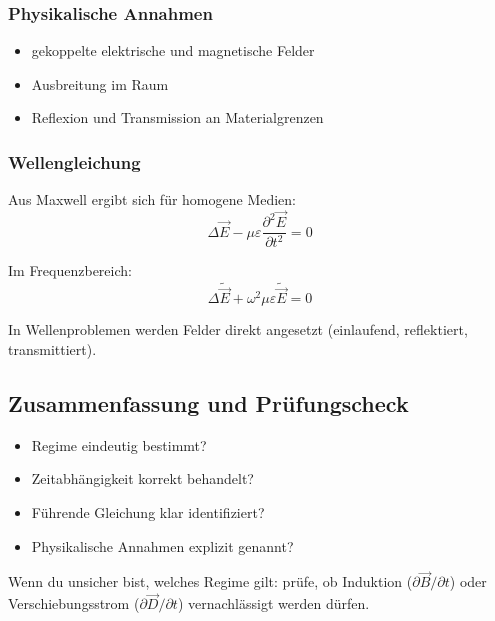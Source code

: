 \documentclass[a4paper]{article}
\newcommand{\E}{\vec E}
\newcommand{\D}{\vec D}
\newcommand{\B}{\vec B}
\newcommand{\eps}{\varepsilon}
\begin{document}
\subsubsection{Physikalische Annahmen}

\begin{itemize}
  \item gekoppelte elektrische und magnetische Felder
  \item Ausbreitung im Raum
  \item Reflexion und Transmission an Materialgrenzen
\end{itemize}

\subsubsection{Wellengleichung}

Aus Maxwell ergibt sich für homogene Medien:
\[
\Delta \E - \mu\eps \frac{\partial^2 \E}{\partial t^2} = 0
\]

Im Frequenzbereich:
\[
\Delta \tilde{\E} + \omega^2 \mu \eps \tilde{\E} = 0
\]

\begin{merke}
In Wellenproblemen werden Felder direkt angesetzt
(einlaufend, reflektiert, transmittiert).
\end{merke}

\subsection{Zusammenfassung und Prüfungscheck}

\begin{checkitem}
\begin{itemize}
  \item Regime eindeutig bestimmt?
  \item Zeitabhängigkeit korrekt behandelt?
  \item Führende Gleichung klar identifiziert?
  \item Physikalische Annahmen explizit genannt?
\end{itemize}
\end{checkitem}

\begin{taktik}
Wenn du unsicher bist, welches Regime gilt:
prüfe, ob Induktion ($\partial \B/\partial t$) oder Verschiebungsstrom ($\partial \D/\partial t$)
vernachlässigt werden dürfen.
\end{taktik}
\end{document}
